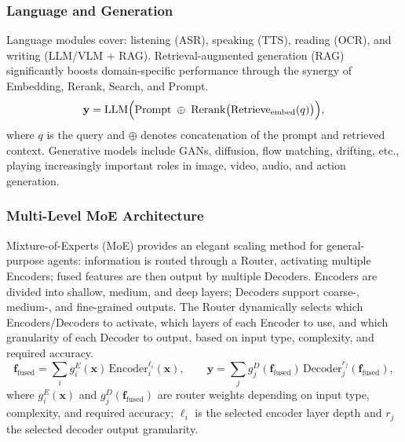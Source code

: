 \documentclass[12pt,a4paper]{article}
\begin{document}
\subsubsection{Language and Generation}
Language modules cover: listening (ASR), speaking (TTS), reading (OCR), and writing (LLM/VLM + RAG). Retrieval-augmented generation (RAG) significantly boosts domain-specific performance through the synergy of Embedding, Rerank, Search, and Prompt.
\begin{equation}
\mathbf{y}=\mathrm{LLM}\Bigl(\mathrm{Prompt}\;\oplus\;\mathrm{Rerank}\bigl(\mathrm{Retrieve}_{\mathrm{embed}}(q)\bigr)\Bigr),
\label{eq:rag}
\end{equation}
where $q$ is the query and $\oplus$ denotes concatenation of the prompt and retrieved context. Generative models include GANs, diffusion, flow matching, drifting, etc., playing increasingly important roles in image, video, audio, and action generation.

\subsubsection{Multi-Level MoE Architecture}
Mixture-of-Experts (MoE) provides an elegant scaling method for general-purpose agents: information is routed through a Router, activating multiple Encoders; fused features are then output by multiple Decoders. Encoders are divided into shallow, medium, and deep layers; Decoders support coarse-, medium-, and fine-grained outputs. The Router dynamically selects which Encoders/Decoders to activate, which layers of each Encoder to use, and which granularity of each Decoder to output, based on input type, complexity, and required accuracy.
\begin{equation}
\mathbf{f}_{\mathrm{fused}}=\sum_{i}g_{i}^{E}(\mathbf{x})\,\mathrm{Encoder}_{i}^{\ell_i}(\mathbf{x}),\qquad
\mathbf{y}=\sum_{j}g_{j}^{D}(\mathbf{f}_{\mathrm{fused}})\,\mathrm{Decoder}_{j}^{r_j}(\mathbf{f}_{\mathrm{fused}}),
\label{eq:moe}
\end{equation}
where $g_i^E(\mathbf{x})$ and $g_j^D(\mathbf{f}_{\mathrm{fused}})$ are router weights depending on input type, complexity, and required accuracy; $\ell_i$ is the selected encoder layer depth and $r_j$ the selected decoder output granularity.
\end{document}
